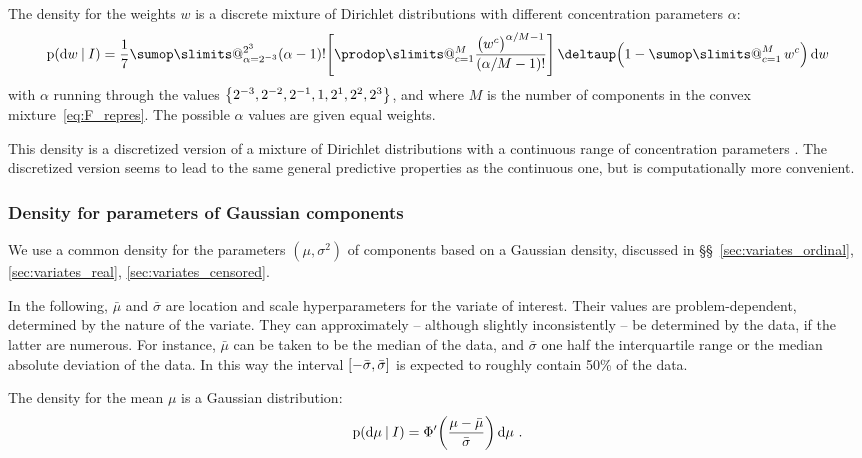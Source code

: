 \documentclass[\ifafour a4paper,12pt,\else a5paper,10pt,\fi%
onecolumn,oneside,article,%
british%
]{memoir}
\makeatletter
\theoremstyle{remark}
\theoremstyle{innote}
\def\sum{\DOTSI\sumop\slimits@}
\def\prod{\DOTSI\prodop\slimits@}
\newcommand*{\delt}{\deltaup}%
\newcommand*{\di}{\mathrm{d}}%
\newcommand*{\defd}{\coloneqq}
\DeclarePairedDelimiter\clcl{[}{]}
\DeclarePairedDelimiter\set{\{}{\}} %
\newcommand*{\p}{\mathrm{p}}%
\renewcommand*{\|}[1][]{\nonscript\:#1\vert\nonscript\:\mathopen{}}
\newcommand*{\sect}{\S}%
\newcommand*{\sects}{\S\S}%
\newcommand*{\eg}{{e.g.}}
\newcommand*{\tsum}{\mathop{\textstyle\sum}\nolimits}
\newcommand*{\muo}{\bar{\mu}}
\newcommand*{\sigmao}{\bar{\sigma}}
\makeatother
\begin{document}
The density for the weights $w$ is a discrete mixture of Dirichlet distributions with different concentration parameters $\alpha$:
\begin{equation}
  \label{eq:density_w}
  \p(\di w\|I) =
  \frac{1}{7}
  \sum_{\alpha=2^{-3}}^{2^{3}}
  (\alpha - 1)! \Biggl[\prod_{c=1}^{M}
  \frac{\bigl(w^{c}\bigr)^{\alpha/M-1}}{(\alpha/M -1)!} \Biggr]
  \, \delt\Bigl(1-\tsum_{c=1}^{M} w^{c}\Bigr)\,
  \di w
\end{equation}
with $\alpha$ running through the values $\set*{2^{-3},2^{-2},2^{-1},1,2^{1},2^{2},2^{3}}$, and where $M$ is the number of components in the convex mixture~\eqref{eq:F_repres}. The possible $\alpha$ values are given equal weights.

This density is a discretized version of a mixture of Dirichlet distributions with a continuous range of concentration parameters \autocites[\eg][\sect\,2.5]{rossi2014}[\sect\,2.1]{rasmussen1999}. The discretized version seems to lead to the same general predictive properties as the continuous one, but is computationally more convenient.


\subsubsection{Density for parameters of Gaussian components}
\label{sec:params_gaussian}

We use a common density for the parameters $(\mu,\sigma^{2})$ of components based on a Gaussian density, discussed in \sects~\ref{sec:variates_ordinal}, \ref{sec:variates_real}, \ref{sec:variates_censored}.

In the following, $\muo$ and $\sigmao$ are location and scale hyperparameters for the variate of interest. Their values are problem-dependent, determined by the nature of the variate. They can approximately -- although slightly inconsistently -- be determined by the data, if the latter are numerous. For instance, $\muo$ can be taken to be the median of the data, and $\sigmao$ one half the interquartile range or the median absolute deviation of the data. In this way the interval $\clcl{-\sigmao, \sigmao}$ is expected to roughly contain 50\% of the data.%


The density for the mean $\mu$ is a Gaussian distribution:
\begin{equation}
  \label{eq:density_mu}
  \p(\di \mu\|I) = \Phi'\biggl(\frac{\mu-\muo}{\sigmao}\biggr)\, \di\mu \ .
\end{equation}
\end{document}
